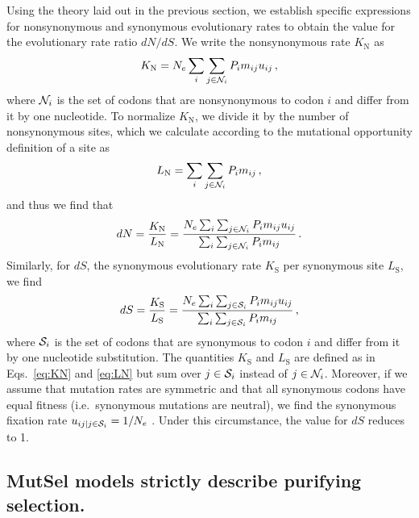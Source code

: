 \documentclass[11pt]{article}
\begin{document}
Using the theory laid out in the previous section, we establish specific expressions for nonsynonymous and synonymous evolutionary rates to obtain the value for the evolutionary rate ratio $dN/dS$. We write the nonsynonymous rate $K_\text{N}$ as 
\begin{equation}\label{eq:KN}
	K_\text{N} = N_e \sum_i \sum_{j \in {\cal N}_i} P_i m_{ij} u_{ij} \,,
\end{equation}
where ${\cal N}_i$ is the set of codons that are nonsynonymous to codon $i$ and differ from it by one nucleotide. To normalize $K_\text{N}$, we divide it by the number of nonsynonymous sites, which we calculate according to the mutational opportunity definition of a site \cite{GoldmanYang1994, Yang2006} as 
\begin{equation}\label{eq:LN}
	L_\text{N} = \sum_i \sum_{j \in {\cal N}_i} P_i m_{ij}\,, 
\end{equation} and thus we find that 
\begin{equation}\label{eq:dN}
	dN = \frac{K_\text{N}}{L_\text{N}}=\frac{N_e \sum_i \sum_{j \in {\cal N}_i} P_i m_{ij} u_{ij} } {\sum_i \sum_{j \in {\cal N}_i}P_i m_{ij}}\,.
\end{equation} Similarly, for $dS$, the synonymous evolutionary rate $K_\text{S}$ per synonymous site $L_\text{S}$, we find
\begin{equation}\label{eq:dS}
	dS = \frac{K_\text{S}}{L_\text{S}}=\frac{ N_e \sum_i \sum_{j \in {\cal S}_i} P_i m_{ij} u_{ij} } {\sum_i \sum_{j \in {\cal S}_i} P_i m_{ij} }\,,
\end{equation}
where ${\cal S}_i$ is the set of codons that are synonymous to codon $i$ and differ from it by one nucleotide substitution. The quantities $K_\text{S}$ and $L_\text{S}$ are defined as in Eqs.~\eqref{eq:KN} and \eqref{eq:LN} but sum over $j\in {\cal S}_i$ instead of $j\in {\cal N}_i$. Moreover, if we assume that mutation rates are symmetric and that all synonymous codons have equal fitness (i.e.\ synonymous mutations are neutral), we find the synonymous fixation rate $u_{ij | j \in {\cal S}_i} = 1/N_e$ \cite{CrowKimura1970}. Under this circumstance, the value for $dS$ reduces to 1.
		
				
\subsection*{MutSel models strictly describe purifying selection.}
\end{document}
